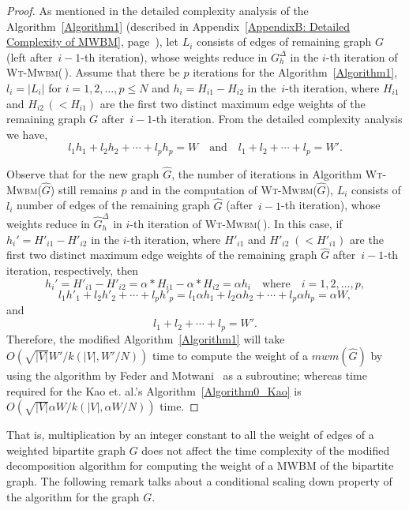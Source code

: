 \documentclass[runningheads,a4paper]{llncs}
\begin{document}
\begin{proof}
As mentioned in the  detailed complexity analysis of the Algorithm~\ref{Algorithm1} (described in Appendix~\ref{AppendixB: Detailed Complexity of MWBM}, page~\pageref{AppendixB: Detailed Complexity of MWBM}), let $L_i$ consists of edges of remaining graph $G$ (left after \,$i-1$-th iteration), whose weights
reduce in $G_h^\Delta$ in the $i$-th iteration of \textsc{Wt-Mwbm}(\,). 
Assume that there be $p$ iterations for the Algorithm~\ref{Algorithm1},
$l_i=|L_i|$ for
$i=1,2,\ldots,p  \leq N$ and $h_i=H_{i1}-H_{i2}$ in the \,$i$-th iteration, where $H_{i1}$ and $H_{i2} \,(<H_{i1})$ are the first two distinct maximum edge weights of the remaining graph $G$ after \,$i-1$-th iteration. 
From the detailed complexity analysis we have,  
\[
l_1h_1+l_2h_2+ \cdots + l_ph_p=W \quad\text{and}\quad 
l_1+l_2+ \cdots + l_p=W'.
\]


Observe that for the new graph $\widehat{G}$, the number of iterations in Algorithm \textsc{Wt-Mwbm}($\widehat{G}$) still remains $p$ and in the computation of \textsc{Wt-Mwbm}($\widehat{G}$), $L_i$ consists of $l_i$ number of edges  of the remaining graph $\widehat{G}$ (after \,$i-1$-th iteration), whose weights
reduce in $\widehat{G}_h^\Delta$ in $i$-th iteration of \textsc{Wt-Mwbm}(\,). 
In this case, if $h_i'=H'_{i1}-H'_{i2}$ in the $i$-th iteration, where $H'_{i1}$ and $H'_{i2} \;(<H'_{i1})$ are the first two distinct maximum edge weights of the remaining graph $\widehat{G}$ after \,$i-1$-th iteration, respectively, then
$$h_i'=H'_{i1}-H'_{i2}=\alpha*H_{i1} - \alpha*H_{i2}=
\alpha h_i \quad\text{where}\quad i=1,2,\ldots,p, $$ 
$$
l_1h'_1+l_2h'_2+ \cdots + l_ph'_p
= l_1 \alpha h_1+l_2 \alpha h_2+ \cdots + l_p \alpha h_p
=\alpha W, $$
and
$$ 
l_1+l_2+ \cdots + l_p=W'.
$$
Therefore, the modified Algorithm~\ref{Algorithm1} will take $O(\sqrt{|V|}W'/k(|V|,W'/{N}))$ time to compute the weight of a
$\textit{mwm}(\widehat{G})$ by using the algorithm by Feder and Motwani~\cite{feder95} as a subroutine; whereas time required for the Kao et. al.'s Algorithm~\ref{Algorithm0_Kao} is  
$O(\sqrt{|V|}\alpha W/k(|V|,\alpha W/N))$ time. 
\end{proof}


That is, multiplication by an integer constant to all the weight of edges of a weighted bipartite graph  $G$ does not affect the time complexity of the modified decomposition algorithm for computing the weight of a MWBM of the bipartite graph. The following remark talks about a conditional scaling down property of the algorithm for  the graph $G$. 
\end{document}
